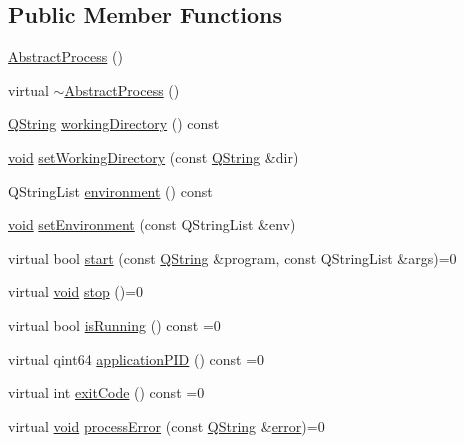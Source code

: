 \subsection*{\-Public \-Member \-Functions}
\begin{DoxyCompactItemize}
\item 
\hyperlink{class_utils_1_1_abstract_process_aa48196443b6c83e4f7ac9e9a983151b6}{\-Abstract\-Process} ()
\item 
virtual \hyperlink{class_utils_1_1_abstract_process_ac53a8f5624f2508148fe9c709afdb7f0}{$\sim$\-Abstract\-Process} ()
\item 
\hyperlink{group___u_a_v_objects_plugin_gab9d252f49c333c94a72f97ce3105a32d}{\-Q\-String} \hyperlink{class_utils_1_1_abstract_process_a4f422dcea1db794d9d3286d4bd9f4468}{working\-Directory} () const 
\item 
\hyperlink{group___u_a_v_objects_plugin_ga444cf2ff3f0ecbe028adce838d373f5c}{void} \hyperlink{class_utils_1_1_abstract_process_a833a637aaa7be2df12fa7ab860b5c7b3}{set\-Working\-Directory} (const \hyperlink{group___u_a_v_objects_plugin_gab9d252f49c333c94a72f97ce3105a32d}{\-Q\-String} \&dir)
\item 
\-Q\-String\-List \hyperlink{class_utils_1_1_abstract_process_abc313189a56ab986759b69c77d47029f}{environment} () const 
\item 
\hyperlink{group___u_a_v_objects_plugin_ga444cf2ff3f0ecbe028adce838d373f5c}{void} \hyperlink{class_utils_1_1_abstract_process_a0cb9aafb2824d30c9fab6dfc8bc783bd}{set\-Environment} (const \-Q\-String\-List \&env)
\item 
virtual bool \hyperlink{class_utils_1_1_abstract_process_a34a319d7ea11064e1f595e765cdfbe63}{start} (const \hyperlink{group___u_a_v_objects_plugin_gab9d252f49c333c94a72f97ce3105a32d}{\-Q\-String} \&program, const \-Q\-String\-List \&args)=0
\item 
virtual \hyperlink{group___u_a_v_objects_plugin_ga444cf2ff3f0ecbe028adce838d373f5c}{void} \hyperlink{class_utils_1_1_abstract_process_aa1d7135cf34e1fc0c33b439a84249a14}{stop} ()=0
\item 
virtual bool \hyperlink{class_utils_1_1_abstract_process_a9c1a33eec47d4f5620792cb72ec9ef1d}{is\-Running} () const =0
\item 
virtual qint64 \hyperlink{class_utils_1_1_abstract_process_a436803fdf47816df0198d446ff1331ac}{application\-P\-I\-D} () const =0
\item 
virtual int \hyperlink{class_utils_1_1_abstract_process_af2d4da0de5edcb38eac2c483188bcafb}{exit\-Code} () const =0
\item 
virtual \hyperlink{group___u_a_v_objects_plugin_ga444cf2ff3f0ecbe028adce838d373f5c}{void} \hyperlink{class_utils_1_1_abstract_process_ab07e7c39b59327b2d9f4843e56fb8f57}{process\-Error} (const \hyperlink{group___u_a_v_objects_plugin_gab9d252f49c333c94a72f97ce3105a32d}{\-Q\-String} \&\hyperlink{uavobjecttemplate_8m_ae37d8f40ba76a59d04a674d824e8721f}{error})=0
\end{DoxyCompactItemize}
